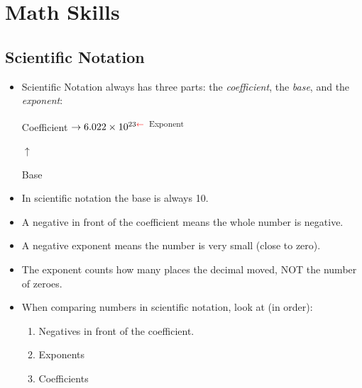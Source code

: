 



\chapter{Math Skills}

\section{Scientific Notation} 


	\begin{itemize}
		\item Scientific Notation always has three parts: the \textit{coefficient}, the \textit{base}, and the \textit{exponent}:
		\begin{center}
			\color{blue} Coefficient $\rightarrow \color{black} 6.022 \times 10^{23 \color{red}\leftarrow}$ \textsuperscript{\color{red}Exponent} \color{black}
			
			\hspace{.7in} \color{orange}$\uparrow$
			
			\hspace{.7in} Base \color{black}
		\end{center}
		\item In scientific notation the \color{orange} base \color{black}is always 10. 
		\item A negative in front of the  \color{blue} coefficient \color{black} means the whole number is negative. 
		\item  A negative \color{red} exponent \color{black} means the number is very small (close to zero). \color{black}
		\item  The \color{red} exponent \color{black} counts how many places the decimal moved, NOT the number of zeroes.	
		\item When comparing numbers in scientific notation, look at (in order): 
		\begin{enumerate}
			\item  Negatives in front of the \color{blue} coefficient. \color{black}
			\item \color{red}Exponents \color{black}
			\item \color{blue}Coefficients \color{black}
		\end{enumerate}
		

\end{itemize}
